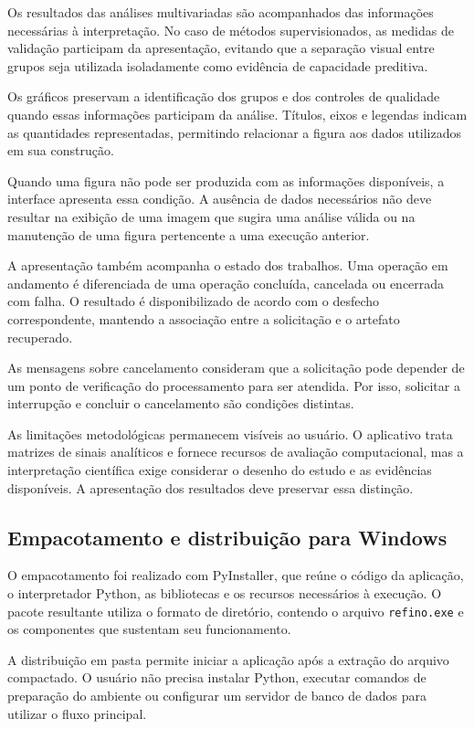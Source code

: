 Os resultados das análises multivariadas são acompanhados das informações necessárias à interpretação. No caso de métodos supervisionados, as medidas de validação participam da apresentação, evitando que a separação visual entre grupos seja utilizada isoladamente como evidência de capacidade preditiva.

Os gráficos preservam a identificação dos grupos e dos controles de qualidade quando essas informações participam da análise. Títulos, eixos e legendas indicam as quantidades representadas, permitindo relacionar a figura aos dados utilizados em sua construção.

Quando uma figura não pode ser produzida com as informações disponíveis, a interface apresenta essa condição. A ausência de dados necessários não deve resultar na exibição de uma imagem que sugira uma análise válida ou na manutenção de uma figura pertencente a uma execução anterior.

A apresentação também acompanha o estado dos trabalhos. Uma operação em andamento é diferenciada de uma operação concluída, cancelada ou encerrada com falha. O resultado é disponibilizado de acordo com o desfecho correspondente, mantendo a associação entre a solicitação e o artefato recuperado.

As mensagens sobre cancelamento consideram que a solicitação pode depender de um ponto de verificação do processamento para ser atendida. Por isso, solicitar a interrupção e concluir o cancelamento são condições distintas.

As limitações metodológicas permanecem visíveis ao usuário. O aplicativo trata matrizes de sinais analíticos e fornece recursos de avaliação computacional, mas a interpretação científica exige considerar o desenho do estudo e as evidências disponíveis. A apresentação dos resultados deve preservar essa distinção.

\subsection{Empacotamento e distribuição para Windows}
\label{subsec:empacotamento-windows}

O empacotamento foi realizado com PyInstaller, que reúne o código da aplicação, o interpretador Python, as bibliotecas e os recursos necessários à execução. O pacote resultante utiliza o formato de diretório, contendo o arquivo \texttt{refino.exe} e os componentes que sustentam seu funcionamento.

A distribuição em pasta permite iniciar a aplicação após a extração do arquivo compactado. O usuário não precisa instalar Python, executar comandos de preparação do ambiente ou configurar um servidor de banco de dados para utilizar o fluxo principal.

